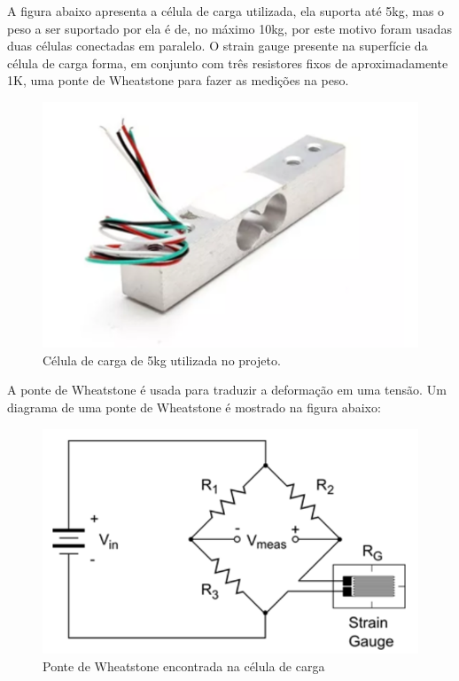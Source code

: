 A figura abaixo apresenta a célula de carga utilizada, ela suporta até 5kg, mas o peso a ser suportado por ela é de, no máximo 10kg, por este motivo foram usadas duas células conectadas em paralelo. O strain gauge presente na superfície da célula de carga forma, em conjunto com três resistores fixos de aproximadamente 1K, uma ponte de Wheatstone para fazer as medições na peso.

\begin{figure}[!h]
\centering \includegraphics[scale=0.5]{figuras/celula_de_carga}
\caption{Célula de carga de 5kg utilizada no projeto.}
\label{celulacarga}
 \end{figure}

A ponte de Wheatstone é usada para traduzir a deformação em uma tensão. Um diagrama de uma ponte de Wheatstone é mostrado na figura abaixo:

\begin{figure}[!h]
\centering \includegraphics[scale=0.6]{figuras/ponte_de_wheatstone}
\caption{ Ponte de Wheatstone encontrada na célula de carga}
\label{wheatstone}
 \end{figure}

